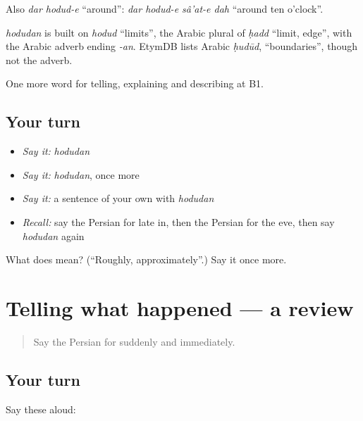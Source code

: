 Also \emph{dar hodud-e} \textquotedblleft{}around\textquotedblright{}: \emph{dar hodud-e sâ'at-e dah} \textquotedblleft{}around ten o'clock\textquotedblright{}.

\begin{cousinweb}
\emph{hodudan} is built on \emph{hodud} \textquotedblleft{}limits\textquotedblright{}, the Arabic plural of \emph{ḥadd} \textquotedblleft{}limit, edge\textquotedblright{}, with the Arabic adverb ending \emph{-an}. EtymDB lists Arabic \emph{ḥudūd}, \textquotedblleft{}boundaries\textquotedblright{}, though not the adverb.
\end{cousinweb}

\begin{grammarlens}[title={What you've built}]
One more word for telling, explaining and describing at B1.
\end{grammarlens}

\subsection*{Your turn}
\begin{itemize}
\raggedright
  \item \emph{Say it:} \emph{hodudan}
  \item \emph{Say it:} \emph{hodudan}, once more
  \item \emph{Say it:} a sentence of your own with \emph{hodudan}
  \item \emph{Recall:} say the Persian for late in, then the Persian for the eve, then say \emph{hodudan} again
\end{itemize}

\begin{tcolorbox}[breakable,colback=teal!4,colframe=teal!35!black,title={Before you move on}]
What does  mean? (\textquotedblleft{}Roughly, approximately\textquotedblright{}.) Say it once more.
\end{tcolorbox}
\section[(dialogue)]{Telling what happened — a review}

\label{lesson:FA-R307-review-300-307}



\begin{quote}
Say the Persian for suddenly and immediately.
\end{quote}

\subsection*{Your turn}
Say these aloud:


